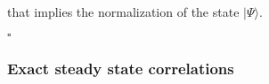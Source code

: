 \documentclass[10pt]{article}
\numberwithin{equation}{section}
\numberwithin{equation}{subsection}
\newcommand{\dt}{\;.}
\begin{document}
that implies the normalization of the state $|\Psi\rangle$. 
\begin{flushright}
	$\square$
\end{flushright}
\begin{comment}
\textbf{Remark}: In the case of $N=2$ we can argue similarly as we did in the Remark of Subsection \ref{subsectionSSHsec}. If we stop distinguishing types of non-empty particles and by introducing $|\bm{\tau}|=\sum_{x=1}^{L}\delta_{\tau_{x,1}}$ we have that \eqref{ABS} reads
\begin{align}
	\Psi^{'}(\bm{\tau})=&\sum_{q=0}^{|\bm{\tau}|}(\alpha-\beta)^{q}\beta^{L-q}\frac{\Gamma(L+2-q)}{\Gamma(L+2)}\sum_{c_{1}=0}^{1}\ldots\sum_{c_{L}=0}^{1}\mathbbm{1}_{\{c_{1}+\cdots+c_{L}=q\}}
	\\&\prod_{x=1}^{L}\left(L+2-x-\sum_{i=x}^{L}c_{i}\right)^{c_{x}}\dt
\end{align}
 For any fixed $q$ we must consider all possible values of $(c_{i})_{i\in\{1,\ldots,m\}}$ such that its sum is equal to $q$. For each of these $(c_{i})_{i\in\{1,\ldots,m\}}$ we add a term given by  
\begin{equation}
	\prod_{x=1}^{L}\left(L+2-x-\sum_{i=x}^{L}c_{i}\right)^{c_{x}}=\prod_{k=1}^{q}\left(L+2-x_{k}-\sum_{i=x_{k}}^{L}c_{i}\right)
\end{equation}
where $x_{k}$ is the position of the $k$-th particle among $q$. 
We introduce $\ell_{1},\ldots,\ell_{q}\in\{1,\ldots,L\}$ such that $\ell_{1}<\ell_{2}<\cdots<\ell_{q}$, thus we have that 
\begin{equation}
	\sum_{c_{1}=0}^{1}\ldots\sum_{c_{L}=0}^{1}\mathbbm{1}_{\{c_{1}+\cdots+c_{L}=q\}}\prod_{k=1}^{q}\left(L+2-x_{k}-\sum_{i=x_{k}}^{L}c_{i}\right)=\sum_{1\leq \ell_{1}<\ldots<\ell_{q}\leq L}\prod_{k=1}^{q}\left(L+2-x_{\ell_{k}}-(q-k+1)\right)\dt
\end{equation}
Moreover, we observe that 
\begin{equation}
	\frac{\Gamma(L+2-q)}{\Gamma(2+L)}=\prod_{k=1}^{q}\frac{1}{(2+L-k)}\dt
\end{equation}
All in all we obtain 
\begin{equation}\label{PsiI-N2}
\Psi^{'}(\bm{\tau})=\sum_{q=0}^{|\bm{\tau}|}(\alpha-\beta)^{q}\beta^{L-q}\sum_{1\leq \ell_{1}<\ldots<\ell_{q}\leq L}\prod_{k=1}^{q}\frac{\left(L+1-x_{\ell_{k}}-q+k\right)}{(2+L-k)}\dt
\end{equation}
\end{comment}
\subsubsection{Exact steady state correlations}
\end{document}
